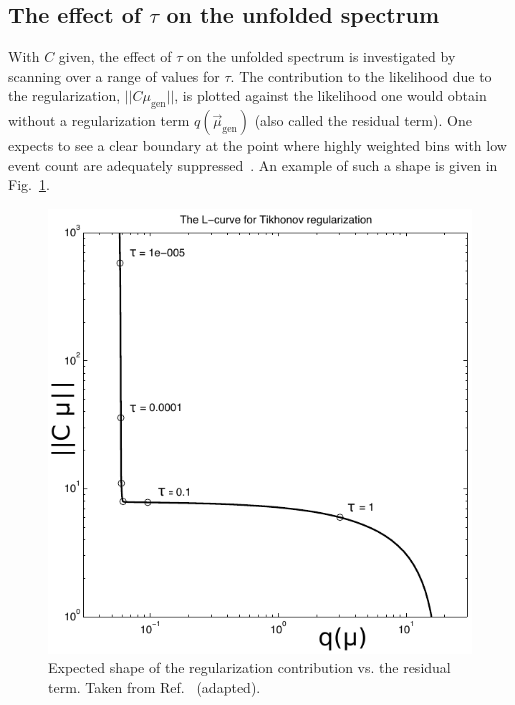 \subsection{The effect of $\tau$ on the unfolded spectrum}

With $C$ given, the effect of $\tau$ on the unfolded spectrum is investigated by scanning over a range of values for $\tau$.
% 
The contribution to the likelihood due to the regularization, $|| C \mu_{\text{gen}} ||$, is plotted against the likelihood one would obtain without a regularization term $q(\vec{\mu}_{\text{gen}})$ (also called the residual term).
% 
One expects to see a clear boundary at the point where highly weighted bins with low event count are adequately suppressed~\cite{Hansen:LShape}.
% 
An example of such a shape is given in Fig.~\ref{fig:expectedlshape}.

\begin{figure}[ht]
 \begin{center}
   \includegraphics[width=\halflinewidth]{img/differentials/regularization/lshapetheory.pdf}
   \caption{ Expected shape of the regularization contribution vs. the residual term. Taken from Ref.~\cite{Hansen:LShape} (adapted). }
   \label{fig:expectedlshape}
 \end{center}
\end{figure}



